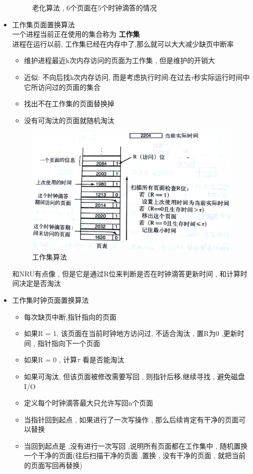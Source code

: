 \documentclass[UTF8,a4paper]{ctexart}
\begin{document}
\begin{itemize}
\begin{figure}[H]
		      \caption{老化算法 , 6个页面在5个时钟滴答的情况}
	      \end{figure}

	\item 工作集页面置换算法\\
	      一个进程当前正在使用的集合称为 \textbf{工作集}\\
	      进程在运行以前, 工作集已经在内存中了,那么就可以大大减少缺页中断率
	      \begin{itemize}
		      \item 维护进程最近k次内存访问的页面为工作集 , 但是维护的开销大
		      \item 近似: 不向后找k次内存访问, 而是考虑执行时间:在过去$\tau$秒实际运行时间中它所访问过的页面的集合
		      \item 找出不在工作集的页面替换掉
		      \item 没有可淘汰的页面就随机淘汰
	      \end{itemize}
	      \begin{figure}[H]
		      \centering
		      \includegraphics[scale = 0.1]{assets/ModernOperatingSystems_6bdcb.png}
		      \caption{工作集算法}
	      \end{figure}
	      和NRU有点像 , 但是它是通过R位来判断是否在时钟滴答更新时间 , 和计算时间决定是否淘汰
	\item 工作集时钟页面置换算法
	      \begin{itemize}
		      \item 每次缺页中断,指针指向的页面
		      \item 如果R = 1, 该页面在当前时钟地方访问过, 不适合淘汰 , 置R为0 ,更新时间 ,  指针指向下一个页面
		      \item 如果R = 0 , 计算$\tau$ 看是否能淘汰
		      \item 如果可淘汰, 但该页面被修改需要写回 , 则指针后移,继续寻找 , 避免磁盘I/O
		      \item 定义每个时钟滴答最大只允许写回n个页面
		      \item 当指针回到起点 , 如果进行了一次写操作 , 那么后续肯定有干净的页面可以替换
		      \item 当回到起点是 ,没有进行一次写回 ,说明所有页面都在工作集中 , 随机置换一个干净的页面(往后扫描干净的页面 ,置换 , 没有干净的页面 , 就把当前的页面写回再替换)
	      \end{itemize}
\end{itemize}
\end{document}

